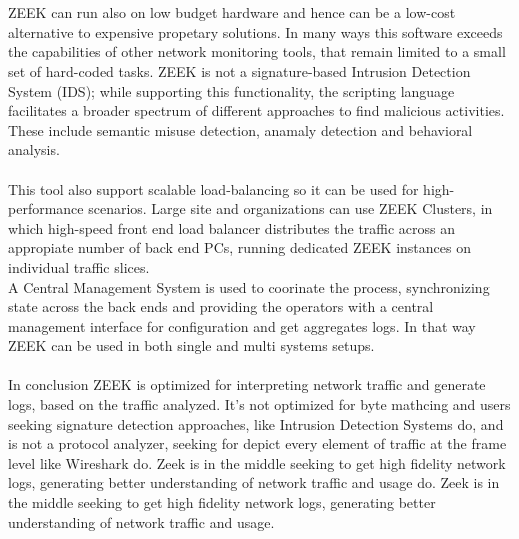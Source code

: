 \\\\
ZEEK can run also on low budget hardware and hence can be a low-cost alternative to expensive propetary 
solutions. In many ways this software exceeds the capabilities of other network monitoring tools, that 
remain limited to a small set of hard-coded tasks. ZEEK is not a signature-based Intrusion Detection 
System (IDS); while supporting this functionality, the scripting language facilitates a broader spectrum of 
different approaches to find malicious activities. These include semantic misuse detection, anamaly detection 
and behavioral analysis.
\\\\
This tool also support scalable load-balancing so it can be used for high-performance scenarios. Large site 
and organizations can use ZEEK Clusters, in which high-speed front end load balancer distributes the traffic 
across an appropiate number of back end PCs, running dedicated ZEEK instances on individual traffic slices.
\\
A Central Management System is used to coorinate the process, synchronizing state across the back ends and 
providing the operators with a central management interface for configuration and get aggregates logs. In that
way ZEEK can be used in both single and multi systems setups.
\\\\
In conclusion ZEEK is optimized for interpreting network traffic and generate logs, based on the traffic 
analyzed. It's not optimized for byte mathcing and users seeking signature detection approaches, like 
Intrusion Detection Systems do, and is not a protocol analyzer, seeking for depict every element of traffic 
at the frame level like Wireshark do. Zeek is in the middle seeking to get high fidelity network logs,
generating better understanding of network traffic and usage do. Zeek is in the middle seeking to get high 
fidelity network logs, generating better understanding of network traffic and usage.
